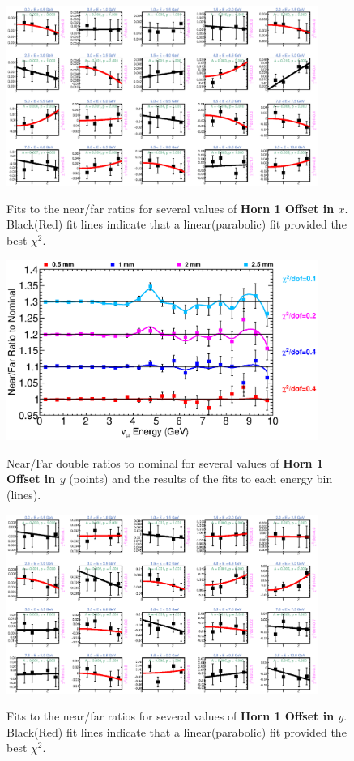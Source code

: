 \begin{figure}[hb]
  \begin{center}
    {\includegraphics[width=4.0in]{figures/Horn1XOffset_nof_fits.eps}}
  \end{center}
\caption{ Fits to the near/far ratios for several values of {\bf Horn 1 Offset in $x$}. Black(Red) fit lines indicate that a linear(parabolic) fit provided the best $\chi^2$. }
\end{figure}

\begin{figure}[ht]
  \begin{center}
    {\includegraphics[width=4.0in]{figures/Horn1YOffset_nof_summary.eps}}
  \end{center}
\caption{ Near/Far double ratios to nominal for several values of {\bf Horn 1 Offset in $y$} (points) and the results of the fits to each energy bin (lines).}
\end{figure}

\begin{figure}[hb]
  \begin{center}
    {\includegraphics[width=4.0in]{figures/Horn1YOffset_nof_fits.eps}}
  \end{center}
\caption{ Fits to the near/far ratios for several values of {\bf Horn 1 Offset in $y$}. Black(Red) fit lines indicate that a linear(parabolic) fit provided the best $\chi^2$. }
\end{figure}


